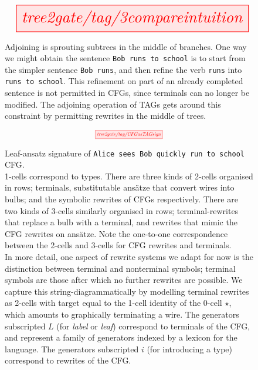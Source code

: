 \begin{figure}
\[\resizebox{0.9\textwidth}{!}{\tikzfig{tree2gate/tag/3compareintuition}}\]
\caption{Adjoining is sprouting subtrees in the middle of branches. One way we might obtain the sentence \texttt{Bob runs to school} is to start from the simpler sentence \texttt{Bob runs}, and then refine the verb \texttt{runs} into \texttt{runs to school}. This refinement on part of an already completed sentence is not permitted in CFGs, since terminals can no longer be modified. The adjoining operation of TAGs gets around this constraint by permitting rewrites in the middle of trees.}
\end{figure}

\begin{figure}[h!]
\[\scalebox{0.6}{\tikzfig{tree2gate/tag/CFGasTAGsign}}\]
\caption{
Leaf-ansatz signature of \texttt{Alice sees Bob quickly run to school} CFG.\\

1-cells correspond to types. There are three kinds of 2-cells organised in rows; terminals, substitutable ans\"{a}tze that convert wires into bulbs; and the symbolic rewrites of CFGs respectively. There are two kinds of 3-cells similarly organised in rows; terminal-rewrites that replace a bulb with a terminal, and rewrites that mimic the CFG rewrites on ans\"{a}tze. Note the one-to-one correspondence between the 2-cells and 3-cells for CFG rewrites and terminals.\\

In more detail, one aspect of rewrite systems we adapt for now is the distinction between terminal and nonterminal symbols; terminal symbols are those after which no further rewrites are possible. We capture this string-diagrammatically by modelling terminal rewrites as 2-cells with target equal to the 1-cell identity of the 0-cell $\star$, which amounts to graphically terminating a wire. The generators subscripted $L$ (for \emph{label} or \emph{leaf}) correspond to terminals of the CFG, and represent a family of generators indexed by a lexicon for the language. The generators subscripted $i$ (for introducing a type) correspond to rewrites of the CFG.
}
\end{figure}

\clearpage

